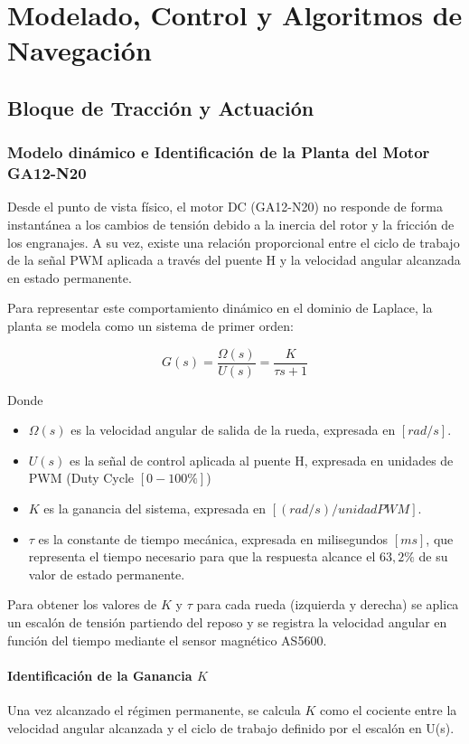 \section{Modelado, Control y Algoritmos de Navegación}



\subsection{Bloque de Tracción y Actuación}


\subsubsection{Modelo dinámico e Identificación de la Planta del Motor GA12-N20}
Desde el punto de vista físico, el motor DC (GA12-N20) no responde de forma instantánea a los cambios de tensión debido a la inercia del rotor y la fricción de los engranajes. A su vez, existe una relación proporcional entre el ciclo de trabajo de la señal PWM aplicada a través del puente H y la velocidad angular alcanzada en estado permanente.

Para representar este comportamiento dinámico en el dominio de Laplace, la planta se modela como un sistema de primer orden:

\[G(s) = \frac{\Omega(s)}{U(s)} = \frac{K}{\tau s + 1}\]

Donde
\begin{itemize}
	\item {$\Omega(s)$} es la velocidad angular de salida de la rueda, expresada en $[rad/s]$.
	\item {$U(s)$} es la señal de control aplicada al puente H, expresada en unidades de PWM (Duty Cycle $[0-100\%]$)
	\item {$K$} es la ganancia del sistema, expresada en $[(rad/s)/unidad PWM]$.
	\item {$\tau$} es la constante de tiempo mecánica, expresada en milisegundos $[ms]$, que representa el tiempo necesario para que la respuesta alcance el $63,2\%$ de su valor de estado permanente.
\end{itemize}

Para obtener los valores de $K$ y $\tau$ para cada rueda (izquierda y derecha) se aplica un escalón de tensión partiendo del reposo y se registra la velocidad angular en función del tiempo mediante el sensor magnético AS5600.

\paragraph{Identificación de la Ganancia $K$}
Una vez alcanzado el régimen permanente, se calcula $K$ como el cociente entre la velocidad angular alcanzada y el ciclo de trabajo definido por el escalón en U(s).

